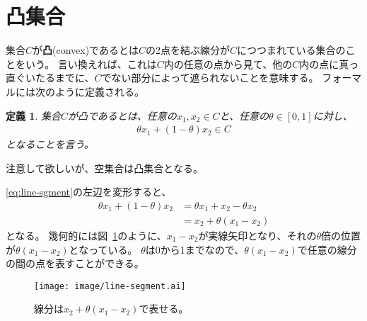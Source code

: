 \documentclass[pdflatex, ja=standard, a4paper]{bxjsarticle}
\newtheorem{definition}{定義}
\newcommand{\figref}[1]{図~\ref{#1}}
\begin{document}
\section{凸集合}
集合$C$が\textbf{凸}(convex)であるとは$C$の2点を結ぶ線分が$C$につつまれている集合のことをいう。
言い換えれば、これは$C$内の任意の点から見て、他の$C$内の点に真っ直ぐいたるまでに、$C$でない部分によって遮られないことを意味する。
フォーマルには次のように定義される。
\begin{definition}
    集合$C$が凸であるとは、任意の$x_1, x_2 \in C$と、任意の$\theta \in [0, 1]$に対し、
    \begin{align} \label{eq:line-sgment}
        \theta x_1 + (1 - \theta) x_2 \in C
    \end{align}
    となることを言う。
\end{definition}
\noindent
注意して欲しいが、空集合は凸集合となる。

\eqref{eq:line-sgment}の左辺を変形すると、
\begin{align*}
    \theta x_1 + (1 - \theta) x_2
        &= \theta x_1 + x_2 - \theta x_2 \\
        &= x_2 + \theta (x_1 - x_2)
\end{align*}
となる。
幾何的には\figref{fig:line-segment}のように、$x_1 - x_2$が実線矢印となり、それの$\theta$倍の位置が$\theta (x_1 - x_2)$となっている。
$\theta$は$0$から$1$までなので、$\theta (x_1 - x_2)$で任意の線分の間の点を表すことができる。
\begin{figure}[b]
    \centering
    \texttt{[image: image/line-segment.ai]}
    \caption{線分は$x_2 + \theta (x_1 - x_2)$で表せる。}
    \label{fig:line-segment}
\end{figure}
\end{document}
